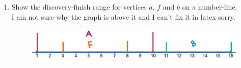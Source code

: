 \documentclass[12pt]{article}
\begin{document}
\begin{enumerate}
\begin{center}
\begin{tikzpicture}[node distance={2cm}, thick, main/.style = {draw, circle}]
    \end{tikzpicture}
\end{center}

\pagebreak
\item Show the discovery-finish range for vertices $a$, $f$ and
$b$ on a number-line. \\ I am not sure why the graph is above it and I can't fix it in latex sorry.


\begin{figure}
    \includegraphics[width = 6in]{numberline.jpg}
\end{figure}
\end{enumerate}
\end{document}
